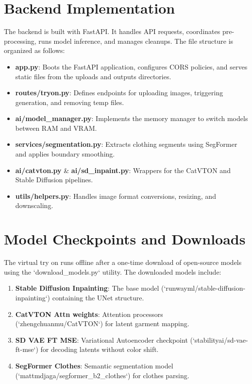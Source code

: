 \documentclass[12pt, a4paper]{report}
\begin{document}
\section{Backend Implementation}

The backend is built with FastAPI. It handles API requests, coordinates pre-processing, runs model inference, and manages cleanups. The file structure is organized as follows:

\begin{itemize}
\item \textbf{app.py}: Boots the FastAPI application, configures CORS policies, and serves static files from the uploads and outputs directories.
\item \textbf{routes/tryon.py}: Defines endpoints for uploading images, triggering generation, and removing temp files.
\item \textbf{ai/model\_manager.py}: Implements the memory manager to switch models between RAM and VRAM.
\item \textbf{services/segmentation.py}: Extracts clothing segments using SegFormer and applies boundary smoothing.
\item \textbf{ai/catvton.py} \& \textbf{ai/sd\_inpaint.py}: Wrappers for the CatVTON and Stable Diffusion pipelines.
\item \textbf{utils/helpers.py}: Handles image format conversions, resizing, and downscaling.
\end{itemize}

\section{Model Checkpoints and Downloads}

The virtual try on runs offline after a one-time download of open-source models using the `download_models.py` utility. The downloaded models include:

\begin{enumerate}
\item \textbf{Stable Diffusion Inpainting}: The base model (`runwayml/stable-diffusion-inpainting`) containing the UNet structure.
\item \textbf{CatVTON Attn weights}: Attention processors (`zhengchuanmu/CatVTON`) for latent garment mapping.
\item \textbf{SD VAE FT MSE}: Variational Autoencoder checkpoint (`stabilityai/sd-vae-ft-mse`) for decoding latents without color shift.
\item \textbf{SegFormer Clothes}: Semantic segmentation model (`mattmdjaga/segformer_b2_clothes`) for clothes parsing.
\end{enumerate}
\end{document}
